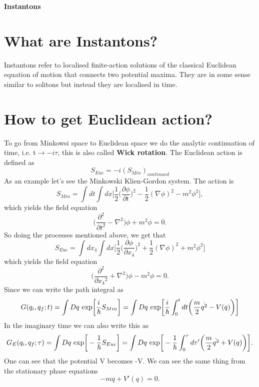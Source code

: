 \documentclass[a4paper, 12pt]{article}
\begin{document}
\begin{center} 
{\Huge{\textbf{Instantons}}}\\
\end{center}

\section {What are Instantons?}
Instantons refer to localised finite-action solutions of the classical Euclidean equation of motion that connects two potential maxima. They are in some sense similar to solitons but instead they are localised in time. 
\section {How to get Euclidean action?}
To go from Minkowsi space to Euclidean space we do the analytic continuation of time, i.e. t$\to -i\tau$, this is also called \textbf{Wick rotation}. The Euclidean action is defined as
\begin{equation}
S_{Euc} = -i(S_{Min})_{continued}
\end{equation}
As an example let's see the Minkowski Klien-Gordon system. The action is 
\begin{equation}
S_{Min} = \int dt \int dx \bigg[\frac{1}{2}\bigg(\frac{\partial\phi}{\partial t} \bigg)^2 - \frac{1}{2}(\nabla \phi)^2 -m^2 \phi^2  \bigg],
\end{equation}
which yields the field equation
\begin{equation}
\bigg( \frac{\partial^2}{\partial t^2} - \nabla^2 \bigg)\phi + m^2\phi = 0.
\end{equation}
So doing the processes mentioned above, we get that
\begin{equation}%
S_{Euc} = \int dx_4 \int dx \bigg[\frac{1}{2}\bigg(\frac{\partial\phi}{\partial x_4} \bigg)^2 + \frac{1}{2}(\nabla \phi)^2 + m^2 \phi^2  \bigg]
\end{equation}
which yields the field equation
\begin{equation}%
\bigg( \frac{\partial^2}{\partial {x_4}^2} + \nabla^2 \bigg)\phi - m^2\phi = 0.
\end{equation}
Since we can write the path integral as
\begin{equation}%
G(q_i,q_f;t) = \int Dq \*\ \textrm{exp}\bigg[\frac{i}{\hbar}S_{Min}\bigg] =  \int Dq \*\ \textrm{exp}\bigg[\frac{i}{\hbar}\int_0^t dt \bigg(\frac{m}{2}\dot{q^2} - V(q) \bigg) \bigg]
\end{equation}
In the imaginary time we can also write this as
\begin{equation}%
G_E(q_i,q_f;\tau) = \int Dq \*\ \textrm{exp}\bigg[-\frac{1}{\hbar}S_{Euc}\bigg] =  \int Dq \*\ \textrm{exp}\bigg[-\frac{1}{\hbar}\int_0^\tau d\tau' \bigg(\frac{m}{2}\dot{q^2} + V(q) \bigg) \bigg].
\end{equation}
One can see that the potential V becomes -V. We can see the same thing from the stationary phase equations
\begin{equation}
-m\ddot{q} + V'(q) = 0.
\end{equation}
\end{document}

